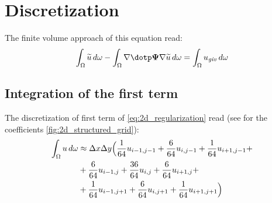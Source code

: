 \section{Discretization} %
The finite volume approach of this equation read:
\begin{align}
    \int_\Omega \widetilde{u}\, d\omega  - \int_\Omega \nabla \dotp \bPsi \nabla \widetilde{u}\, d\omega  = \int_\Omega  u_{\it{giv}}\, d\omega \label{eq:2d_regularization}
\end{align}

\subsection*{Integration of the first term}
The discretization of first term of \autoref{eq:2d_regularization} read
(see for the coefficients \autoref{fig:2d_structured_grid}):
\begin{align}
    \int_\Omega  u\, d\omega
    & \approx \Delta x \Delta y \Bigl( \frac{1}{64} u_{i-1,j-1} + \frac{6}{64} u_{i,j-1} + \frac{1}{64} u_{i+1,j-1} +
    \nonumber \\
    & + \frac{6}{64} u_{i-1,j} + \frac{36}{64} u_{i,j} + \frac{6}{64} u_{i+1,j} +
    \nonumber \\
    &  +\frac{1}{64} u_{i-1,j+1} + \frac{6}{64} u_{i,j+1} + \frac{1}{64} u_{i+1,j+1} \Bigl)
\end{align}
